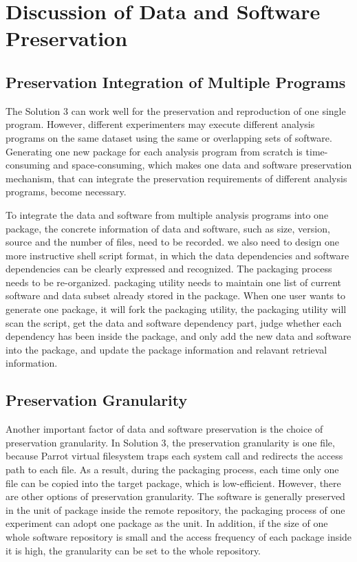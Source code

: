 \documentclass{acm_proc_article-sp}
\begin{document}
\section{Discussion of Data and Software Preservation}
\subsection{Preservation Integration of Multiple Programs}
The Solution 3 can work well for the preservation and reproduction of one single program. However, different experimenters may execute different analysis programs on the same dataset using the same or overlapping sets of software. Generating one new package for each analysis program from scratch is time-consuming and space-consuming, which makes one data and software preservation mechanism, that can integrate the preservation requirements of different analysis programs, become necessary. 


To integrate the data and software from multiple analysis programs into one package, the concrete information of data and software, such as size, version, source and the number of files, need to be recorded. we also need to design one more instructive shell script format, in which the data dependencies and software dependencies can be clearly expressed and recognized. The packaging process needs to be re-organized. packaging utility needs to maintain one list of current software and data subset already stored in the package. When one user wants to generate one package, it will fork the packaging utility, the packaging utility will scan the script, get the data and software dependency part, judge whether each dependency has been inside the package, and only add the new data and software into the package, and update the package information and relavant retrieval information.

\subsection{Preservation Granularity}
Another important factor of data and software preservation is the choice of preservation granularity. In Solution 3, the preservation granularity is one file, because Parrot virtual filesystem traps each system call and redirects the access path to each file. As a result, during the packaging process, each time only one file can be copied into the target package, which is low-efficient. However, there are other options of preservation granularity. The software is generally preserved in the unit of package inside the remote repository, the packaging process of one experiment can adopt one package as the unit. In addition, if the size of one whole software repository is small and the access frequency of each package inside it is high, the granularity can be set to the whole repository.
\end{document}
